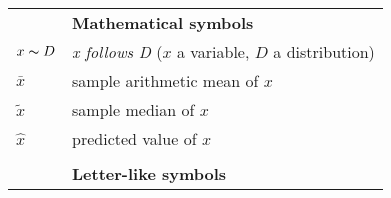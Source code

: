 \begin{longtable}{p{}p{}} 

		    &  \textbf{Mathematical symbols} \\

  $x\thicksim D$    & \textit{x follows D} ($x$ a variable, $D$ a distribution) \\
  $\bar{x}$         & sample arithmetic mean of $x$\\
  $\tilde{x}$       & sample median of $x$\\
  $\hat{x}$         & predicted value of $x$\\
 
                    & \\
		    &  \textbf{Letter-like symbols} \\


\end{longtable}
